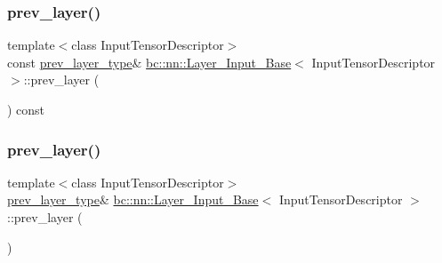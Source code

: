 \mbox{\label{classbc_1_1nn_1_1Layer__Input__Base_a30fe05002f852c298572f41da7486670}} 
\subsubsection{\texorpdfstring{prev\+\_\+layer()}{prev\_layer()}\hspace{0.1cm}{\footnotesize\ttfamily [1/4]}}
{\footnotesize\ttfamily template$<$class Input\+Tensor\+Descriptor$>$ \\
const \hyperlink{structbc_1_1nn_1_1Layer__Output__Base}{prev\+\_\+layer\+\_\+type}\& \hyperlink{classbc_1_1nn_1_1Layer__Input__Base}{bc\+::nn\+::\+Layer\+\_\+\+Input\+\_\+\+Base}$<$ Input\+Tensor\+Descriptor $>$\+::prev\+\_\+layer (\begin{DoxyParamCaption}{ }\end{DoxyParamCaption}) const\hspace{0.3cm}{\ttfamily [inline]}}

\mbox{\label{classbc_1_1nn_1_1Layer__Input__Base_aa46a9668548a06e6538f485a0200edbc}} 
\subsubsection{\texorpdfstring{prev\+\_\+layer()}{prev\_layer()}\hspace{0.1cm}{\footnotesize\ttfamily [2/4]}}
{\footnotesize\ttfamily template$<$class Input\+Tensor\+Descriptor$>$ \\
\hyperlink{structbc_1_1nn_1_1Layer__Output__Base}{prev\+\_\+layer\+\_\+type}\& \hyperlink{classbc_1_1nn_1_1Layer__Input__Base}{bc\+::nn\+::\+Layer\+\_\+\+Input\+\_\+\+Base}$<$ Input\+Tensor\+Descriptor $>$\+::prev\+\_\+layer (\begin{DoxyParamCaption}{ }\end{DoxyParamCaption})\hspace{0.3cm}{\ttfamily [inline]}}

